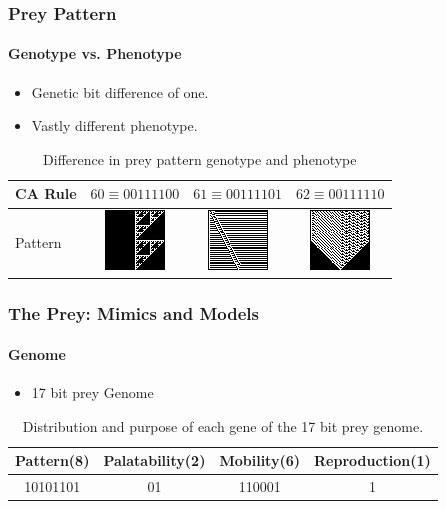 \frame
{
	\frametitle{Prey Pattern}
	\framesubtitle{Genotype vs. Phenotype}
	
	\begin{itemize}
		\item Genetic bit difference of one.
		\item Vastly different phenotype.
	\end{itemize}
	
	\begin{table}
	\centering
	\begin{scriptsize}
	\begin{tabular}{|l|c|c|c|}
	  \hline
	  CA Rule & \(60 \equiv 00111100\) & \(61 \equiv 00111101\) & \(62 \equiv 00111110 \) \\ \hline
	  Pattern & \parbox[c]{2.1em}{\includegraphics[scale=0.40]{../tex/images/CARule60}} 
	  				& \parbox[c]{2.1em}{\includegraphics[scale=0.40]{../tex/images/CARule61}} 
	  				& \parbox[c]{2.1em}{\includegraphics[scale=0.40]{../tex/images/CARule62}}\\
	  \hline
	\end{tabular}
	\end{scriptsize}
	\caption{Difference in prey pattern genotype and phenotype}
	\label{tab:diff-in-pattern}
	\end{table}
}

\frame
{
	\frametitle{The Prey: Mimics and Models}
	\framesubtitle{Genome}
	
	\begin{itemize}
		\item 17 bit prey Genome
	\end{itemize}
	
	\begin{table}[H]
	\centering
	\begin{scriptsize}
	\begin{spacing}{1.5}
	\begin{tabular}{|c|c|c|c|}
		\hline
			\textbf{Pattern(8)} & \textbf{Palatability(2)} & \textbf{Mobility(6)} & \textbf{Reproduction(1)} \\ \hline
			10101101					 	& 							01		 		 & 			110001					&					1						 		 \\ \hline
	\end{tabular}
	\end{spacing}
	\end{scriptsize}
	\caption{Distribution and purpose of each gene of the 17 bit prey genome.}
	\label{tab:prey-genome}
	\end{table}
}

